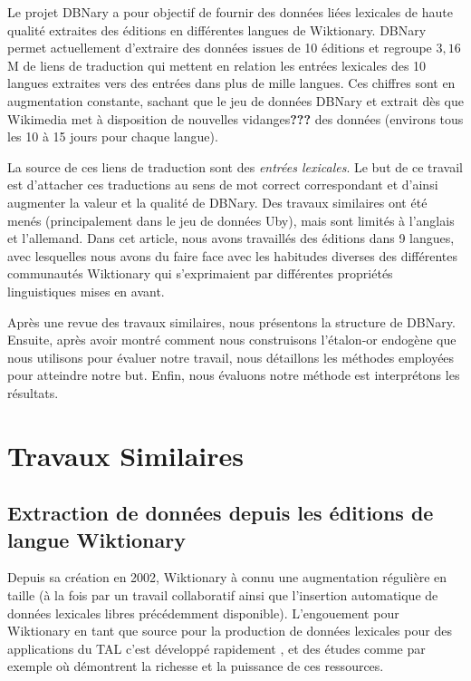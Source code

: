 \documentclass[10pt,a4paper,twoside]{article}
\begin{document}
Le projet DBNary \cite{serasset:dbnary-swj} a pour objectif de fournir des données liées lexicales de haute qualité extraites des éditions en différentes langues de Wiktionary. DBNary permet actuellement d'extraire des données issues de 10 éditions et regroupe $3,16$M de liens de traduction qui mettent en relation les entrées lexicales des 10 langues extraites vers des entrées dans plus de mille langues. Ces chiffres sont en augmentation constante, sachant que le jeu de données DBNary et extrait dès que Wikimedia met à disposition de nouvelles vidanges\textbf{???} des données (environs tous les 10 à 15 jours pour chaque langue).

La source de ces liens de traduction sont des \emph{entrées lexicales}. Le but de ce travail est d'attacher ces traductions au sens de mot correct correspondant et d'ainsi augmenter la valeur et la qualité de DBNary.
Des travaux similaires ont été menés (principalement dans le jeu de données Uby), mais sont limités à l'anglais et l'allemand. Dans cet article, nous avons travaillés des éditions dans 9 langues, avec lesquelles nous avons du faire face avec les habitudes diverses des différentes communautés Wiktionary qui s'exprimaient par différentes propriétés linguistiques mises en avant. 

Après une revue des travaux similaires, nous présentons la structure de DBNary. Ensuite, après avoir montré comment nous construisons l'étalon-or endogène  que nous utilisons pour évaluer notre travail, nous détaillons les méthodes employées pour atteindre notre but. Enfin, nous évaluons notre méthode est interprétons les résultats.


\section{Travaux Similaires}

\subsection{Extraction de données depuis les éditions de langue Wiktionary} Depuis sa création en 2002, Wiktionary à connu une augmentation régulière en taille (à la fois par un travail collaboratif ainsi que l'insertion automatique de données lexicales libres précédemment disponible). L'engouement pour Wiktionary en tant que source pour la production de données lexicales pour des applications du TAL c'est développé rapidement , et des études comme par exemple \cite{Zesch:AAAI2008} où \cite{navarro-EtAl:2009:PeoplesWeb} démontrent la richesse et la puissance de ces ressources.
\end{document}
